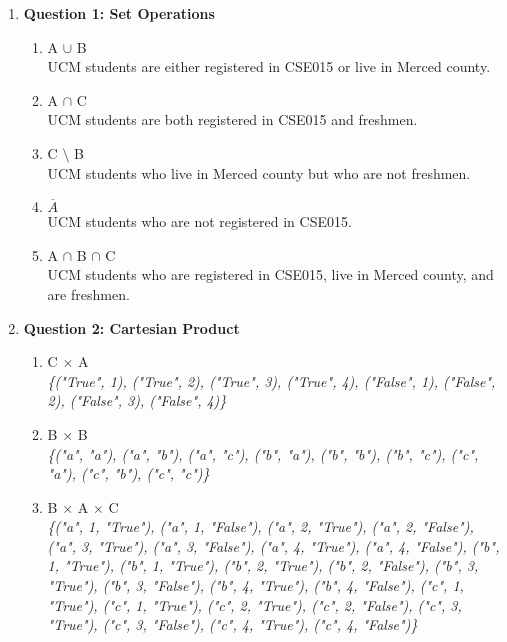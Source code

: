 \documentclass[11pt]{article}
\begin{document}
\begin{enumerate}
\item
\textbf{Question 1: Set Operations} %
\begin{enumerate}[label=(\alph*)]
\item %
A $\cup$ B \\
UCM students are either registered in CSE015 or live in Merced county.

\item %
A $\cap$ C \\
UCM students are both registered in CSE015 and freshmen.

\item %
C $\setminus$ B \\
UCM students who live in Merced county but who are not freshmen.

\item %
$\overline {A}$ \\
UCM students who are not registered in CSE015.

\item %
A $\cap$ B $\cap$ C \\
UCM students who are registered in CSE015, live in Merced county, and are freshmen.
\end{enumerate}

\item
\textbf{Question 2: Cartesian Product } %
\begin{enumerate}[label=(\alph*)]
\item %
C $\times$ A \\
\textit {
\{("True", 1), ("True", 2), ("True", 3), ("True", 4), ("False", 1), ("False", 2), ("False", 3), ("False", 4)\}
}

\item %
B $\times$ B \\
\textit {
\{("a", "a"), ("a", "b"), ("a", "c"), ("b", "a"), ("b", "b"), ("b", "c"), ("c", "a"), ("c", "b"), ("c", "c")\}
}

\item %
B $\times$ A $\times$ C \\
\textit {
\{("a", 1, "True"), ("a", 1, "False"), ("a", 2, "True"), ("a", 2, "False"), ("a", 3, "True"), ("a", 3, "False"), ("a", 4, "True"), ("a", 4, "False"), ("b", 1, "True"), ("b", 1, "True"), ("b", 2, "True"), ("b", 2, "False"), ("b", 3, "True"), ("b", 3, "False"), ("b", 4, "True"), ("b", 4, "False"), ("c", 1, "True"), ("c", 1, "True"), ("c", 2, "True"), ("c", 2, "False"), ("c", 3, "True"), ("c", 3, "False"), ("c", 4, "True"), ("c", 4, "False")\}
}
\end{enumerate}


\end{enumerate}
\end{document}
